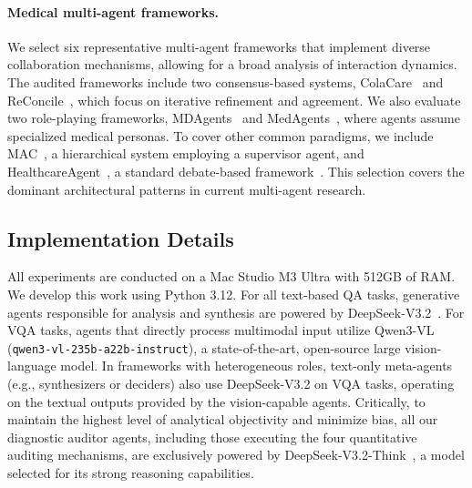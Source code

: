 \documentclass{article}
\begin{document}
\paragraph{Medical multi-agent frameworks.}
We select six representative multi-agent frameworks that implement diverse collaboration mechanisms, allowing for a broad analysis of interaction dynamics. The audited frameworks include two consensus-based systems, ColaCare~\cite{wang2025colacare} and ReConcile~\cite{chen2024reconcile}, which focus on iterative refinement and agreement. We also evaluate two role-playing frameworks, MDAgents~\cite{kim2024mdagents} and MedAgents~\cite{tang2024medagents}, where agents assume specialized medical personas. To cover other common paradigms, we include MAC~\cite{chen2025enhancing}, a hierarchical system employing a supervisor agent, and HealthcareAgent~\cite{ren2025healthcare}, a standard debate-based framework~\cite{du2023improving}. This selection covers the dominant architectural patterns in current multi-agent research.

\subsection{Implementation Details}

All experiments are conducted on a Mac Studio M3 Ultra with 512GB of RAM. We develop this work using Python 3.12. For all text-based QA tasks, generative agents responsible for analysis and synthesis are powered by DeepSeek-V3.2~\cite{liu2024deepseekv3,deepseek_v32}. For VQA tasks, agents that directly process multimodal input utilize Qwen3-VL~\cite{Qwen25VL,Qwen3VL} (\texttt{qwen3-vl-235b-a22b-instruct}), a state-of-the-art, open-source large vision-language model. In frameworks with heterogeneous roles, text-only meta-agents (e.g., synthesizers or deciders) also use DeepSeek-V3.2 on VQA tasks, operating on the textual outputs provided by the vision-capable agents. Critically, to maintain the highest level of analytical objectivity and minimize bias, all our diagnostic auditor agents, including those executing the four quantitative auditing mechanisms, are exclusively powered by DeepSeek-V3.2-Think~\cite{liu2024deepseekv3,guo2025deepseekr1}, a model selected for its strong reasoning capabilities.
\end{document}
